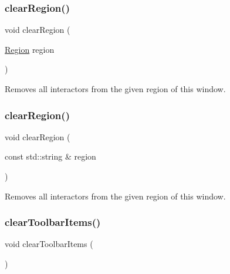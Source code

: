 \subsubsection{\texorpdfstring{clear\+Region()}{clearRegion()}\hspace{0.1cm}{\footnotesize\ttfamily [1/2]}}
{\footnotesize\ttfamily void clear\+Region (\begin{DoxyParamCaption}\item[{\mbox{\hyperlink{classsgl_1_1GWindow_a81a01a86de31071a92e6cce0bab9bc4b}{Region}}}]{region }\end{DoxyParamCaption})\hspace{0.3cm}{\ttfamily [virtual]}}



Removes all interactors from the given region of this window. 

\mbox{\label{classsgl_1_1GWindow_aeba526cb4d6d6f3d8d6f376656af8dc8}} 
\subsubsection{\texorpdfstring{clear\+Region()}{clearRegion()}\hspace{0.1cm}{\footnotesize\ttfamily [2/2]}}
{\footnotesize\ttfamily void clear\+Region (\begin{DoxyParamCaption}\item[{const std\+::string \&}]{region }\end{DoxyParamCaption})\hspace{0.3cm}{\ttfamily [virtual]}}



Removes all interactors from the given region of this window. 

\mbox{\label{classsgl_1_1GWindow_a7f7fac3c967032599677ee0087af2220}} 
\subsubsection{\texorpdfstring{clear\+Toolbar\+Items()}{clearToolbarItems()}}
{\footnotesize\ttfamily void clear\+Toolbar\+Items (\begin{DoxyParamCaption}{ }\end{DoxyParamCaption})\hspace{0.3cm}{\ttfamily [virtual]}}



